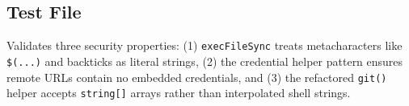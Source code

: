 \subsection*{Test File}

Validates three security properties: (1) \texttt{execFileSync} treats metacharacters like \texttt{\$(...)} and backticks as literal strings, (2) the credential helper pattern ensures remote URLs contain no embedded credentials, and (3) the refactored \texttt{git()} helper accepts \texttt{string[]} arrays rather than interpolated shell strings.
